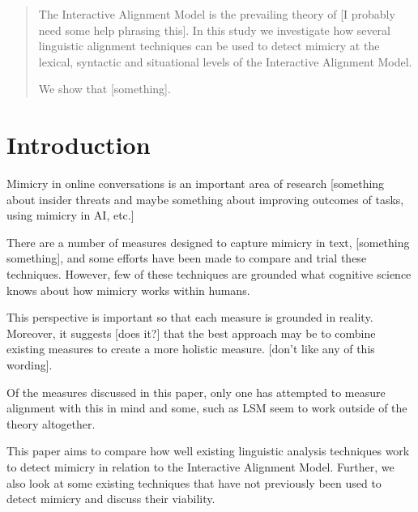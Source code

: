 \documentclass[conference]{IEEEtran}
\begin{document}
\begin{abstract}
The Interactive Alignment Model is the prevailing theory of
[I probably need some help phrasing this].
In this study we investigate how several linguistic alignment techniques can be used
to detect mimicry at the lexical, syntactic and situational levels of the
Interactive Alignment Model.

We show that [something].
\end{abstract}





%
\IEEEpeerreviewmaketitle



\section{Introduction}

Mimicry in online conversations is an important area of research [something about insider threats
and maybe something about improving outcomes of tasks, using mimicry in AI, etc.]

There are a number of measures designed to capture mimicry in text, [something something], and some
efforts have been made to compare and trial these techniques. However, few of these techniques are 
grounded what cognitive science knows about how mimicry works within humans.

This perspective is important so that each measure is grounded in reality.
Moreover, it suggests [does it?] that the best approach may be to combine existing measures to create
a more holistic measure. [don't like any of this wording].

Of the measures discussed in this paper, only one has attempted to measure alignment with this in mind
and some, such as LSM seem to work outside of the theory altogether.

This paper aims to compare how well existing linguistic analysis techniques work to detect mimicry in 
relation to the Interactive Alignment Model. Further, we also look at some existing techniques that 
have not previously been used to detect mimicry and discuss their viability.
\end{document}
